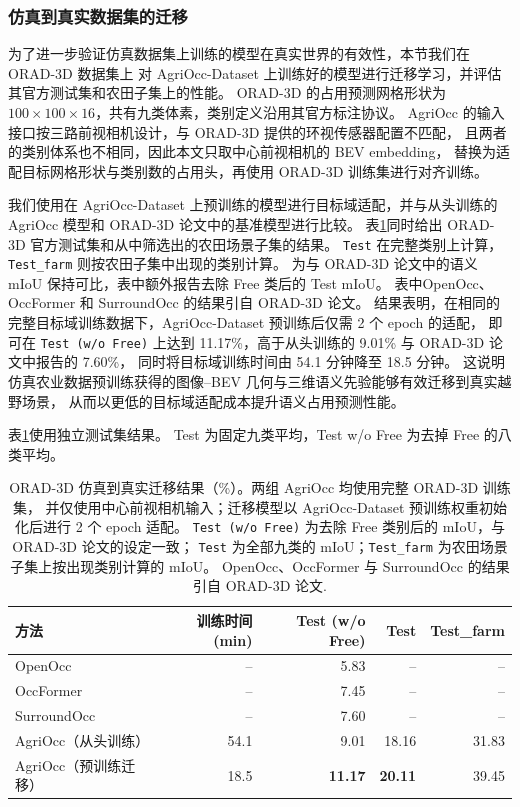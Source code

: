 \documentclass[a4paper,fleqn]{cas-sc}
\begin{document}
\subsubsection{仿真到真实数据集的迁移}\label{sec:orad_transfer}
为了进一步验证仿真数据集上训练的模型在真实世界的有效性，本节我们在 ORAD-3D 数据集\citep{chen2025orad3d}上
对 AgriOcc-Dataset 上训练好的模型进行迁移学习，并评估其官方测试集和农田子集上的性能。
ORAD-3D 的占用预测网格形状为 $100\times100\times16$，共有九类体素，类别定义沿用其官方标注协议。
AgriOcc 的输入接口按三路前视相机设计，与 ORAD-3D 提供的环视传感器配置不匹配，
且两者的类别体系也不相同，因此本文只取中心前视相机的 BEV embedding，
替换为适配目标网格形状与类别数的占用头，再使用 ORAD-3D 训练集进行对齐训练。

我们使用在 AgriOcc-Dataset 上预训练的模型进行目标域适配，并与从头训练的 AgriOcc 模型和 ORAD-3D 论文中的基准模型进行比较。
表\ref{tab:orad}同时给出 ORAD-3D 官方测试集和从中筛选出的农田场景子集的结果。
\texttt{Test} 在完整类别上计算，\texttt{Test\_farm} 则按农田子集中出现的类别计算。
为与 ORAD-3D 论文中的语义 mIoU 保持可比，表中额外报告去除 Free 类后的 Test mIoU。
表中OpenOcc、OccFormer 和 SurroundOcc 的结果引自 ORAD-3D 论文\citep{chen2025orad3d}。
结果表明，在相同的完整目标域训练数据下，AgriOcc-Dataset 预训练后仅需 2 个 epoch 的适配，
即可在 \texttt{Test (w/o Free)} 上达到 11.17\%，高于从头训练的 9.01\% 与 ORAD-3D 论文中报告的 7.60\%，
同时将目标域训练时间由 54.1 分钟降至 18.5 分钟。
这说明仿真农业数据预训练获得的图像--BEV 几何与三维语义先验能够有效迁移到真实越野场景，
从而以更低的目标域适配成本提升语义占用预测性能。
 
表\ref{tab:orad}使用独立测试集结果。
Test 为固定九类平均，Test w/o Free 为去掉 Free 的八类平均。
\begin{table}[pos=htbp]
\centering
\caption{ORAD-3D 仿真到真实迁移结果（\%）。两组 AgriOcc 均使用完整 ORAD-3D 训练集，
并仅使用中心前视相机输入；迁移模型以 AgriOcc-Dataset 预训练权重初始化后进行 2 个 epoch 适配。
\texttt{Test (w/o Free)} 为去除 Free 类别后的 mIoU，与 ORAD-3D 论文的设定一致；
\texttt{Test} 为全部九类的 mIoU；\texttt{Test\_farm} 为农田场景子集上按出现类别计算的 mIoU。
OpenOcc、OccFormer 与 SurroundOcc 的结果引自 ORAD-3D 论文.}
\label{tab:orad}
\fontsize{9}{11}\selectfont
\setlength{\tabcolsep}{2.6pt}
\begin{tabular}{lrrrr}
\toprule 
方法 & 训练时间(min) & Test (w/o Free) & Test & Test\_farm \\
\midrule
OpenOcc\citep{jiang2024openocc} & -- & 5.83 & -- & -- \\
OccFormer\citep{zhang2023occformer} & -- & 7.45 & -- & -- \\
SurroundOcc\citep{wei2023surroundocc} & -- & 7.60 & -- & -- \\
\midrule
AgriOcc（从头训练） & 54.1 & 9.01 & 18.16 & 31.83 \\
\midrule
AgriOcc（预训练迁移） & 18.5 & \textbf{11.17} & \textbf{20.11} & 39.45 \\
\bottomrule
\end{tabular}
\end{table}
\end{document}
